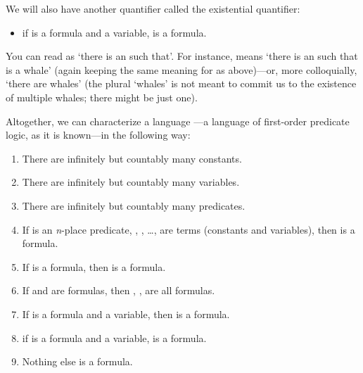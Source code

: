 We will also have another quantifier called the existential quantifier:

\begin{itemize}

 \item if \p{\phi} is a formula and \p{\upsilon} a variable, 
  \p{\lthereis\upsilon\phi} is a formula.

\end{itemize}

You can read \p{\lthereis\upsilon} as `there is an \p{\upsilon} such that'. For 
instance,  means `there is an  such that  is a 
whale' (again keeping the same meaning for  as above)---or, more 
colloquially, `there are whales' (the plural `whales' is not meant to commit us 
to the existence of multiple whales; there might be just one).


Altogether, we can characterize  a language \lL[Q]---a language of first-order 
predicate logic, as it is known---in the following way:

\begin{enumerate}

 \item There are infinitely but countably many constants.

 \item There are infinitely but countably many variables.

 \item There are infinitely but countably many predicates.

 \item If  is an \emph{n}-place predicate, , , 
  \ldots,  are terms (constants and variables), then  is a formula.

 \item If \p{\phi} is a formula, then \p{\lnot\phi} is a formula.

 \item If \p{\phi} and \p{\psi} are formulas, then \p{(\phi \land \psi)}, 
  \p{(\phi \lor \psi)}, \p{(\phi \limplies \psi)} are all formulas.

  \item If \p{\phi} is a formula and \p{\upsilon} a variable, then \p{\lforall 
	\upsilon
   \phi} is a formula.

 \item if \p{\phi} is a formula and \p{\upsilon} a variable,  
  \p{\lthereis\upsilon\phi} is a formula.
 
 \item Nothing else is a formula.

\end{enumerate}

